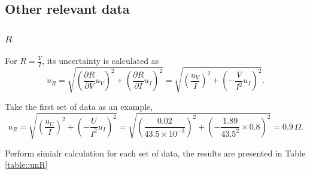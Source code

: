 \documentclass[a4paper]{article}
\begin{document}
\subsection{Other relevant data}

\subsubsection{$R$}

For $R = \frac{V}{I}$, its uncertainty is calculated as
$$u_R = \sqrt{(\frac{\partial R}{\partial V}u_V)^2 + (\frac{\partial R}{\partial I}u_I)^2} = \sqrt{(\frac{u_V}{I})^2 + (-\frac{V}{I^2}u_I)^2}.$$

Take the first set of data as an example,
$$u_R = \sqrt{(\frac{u_U}{I})^2 + (-\frac{U}{I^2}u_I)^2} = \sqrt{(\frac{0.02}{43.5\times 10^{-3}})^2 + (-\frac{1.89}{43.5^2}\times 0.8)^2} = 0.9\,\Omega .$$

Perform simialr calculation for each set of data, the results are presented in Table \ref{table::unR}
\end{document}

